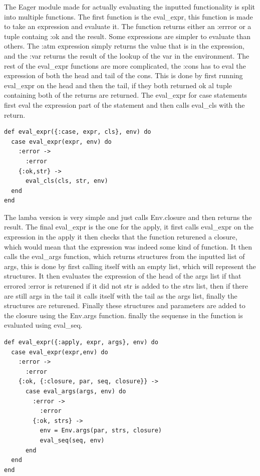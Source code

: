 \documentclass[a4paper,11pt]{article}
\begin{document}
The Eager module made for actually evaluating the inputted functionality is split into multiple functions. The first function is the eval\_expr, this function is made to take an expression and evaluate it. The function returns either an :errror or a tuple containg :ok and the result. Some expressions are simpler to evaluate than others. The :atm expression simply returns the value that is in the expression, and the :var returns the result of the lookup of the var in the environment.
The rest of the eval\_expr functions are more complicated, the :cons has to eval the expression of both the head and tail of the cons. This is done by first running eval\_expr on the head and then the tail, if they both returned ok al tuple containing both of the returns are returned.
The eval\_expr for case statements first eval the expression part of the statement and then calls eval\_cls with the return.
\begin{verbatim}
def eval_expr({:case, expr, cls}, env) do
  case eval_expr(expr, env) do
    :error ->
      :error
    {:ok,str} ->
      eval_cls(cls, str, env)
  end
end  
\end{verbatim}
The lamba version is very simple and just calls Env.closure and then returns the result.
The final eval\_expr is the one for the apply, it first calls eval\_expr on the expression in the apply it then checks that the function returened a closure, which would mean that the expression was indeed some kind of function. It then calls the eval\_args function, which returns structures from the inputted list of args, this is done by first calling itself with an empty list, which will represent the structures. It then evaluates the expression of the head of the args list if that errored :error is returened if it did not str is added to the strs list, then if there are still args in the tail it calls itself with the tail as the args list, finally the structures are returened.  Finally these structures and parameters are added to the closure using the Env.args function. finally the sequense in the function is evaluated using eval\_seq.
\begin{verbatim}
def eval_expr({:apply, expr, args}, env) do
  case eval_expr(expr,env) do
    :error ->
      :error
    {:ok, {:closure, par, seq, closure}} ->
      case eval_args(args, env) do
        :error ->
          :error
        {:ok, strs} ->
          env = Env.args(par, strs, closure)
          eval_seq(seq, env)
      end
  end
end
\end{verbatim}
\end{document}
